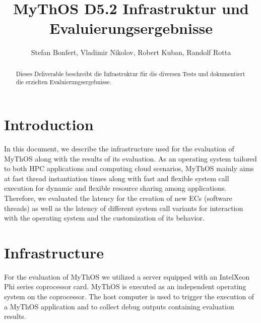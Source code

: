 

\title{MyThOS D5.2 Infrastruktur und Evaluierungsergebnisse}
\author{Stefan Bonfert, Vladimir Nikolov, Robert Kuban, Randolf Rotta}



\maketitle

\begin{abstract}

Dieses Deliverable beschreibt die Infrastruktur für die diversen Tests und
dokumentiert die erzielten Evaluierungsergebnisse.

\end{abstract}

\newpage
\tableofcontents


\section{Introduction}
\label{sec:introduction}
In this document, we describe the infrastructure used for the evaluation of
MyThOS along with the results of its evaluation. As an operating system tailored
to both HPC applications and computing cloud scenarios, MyThOS mainly aims at
fast thread instantiation times along with fast and flexible system call
execution for dynamic and flexible resource sharing among applications.
Therefore, we evaluated the latency for the creation of new ECs (software
threads) as well as the latency of different system call variants for
interaction with the operating system and the customization of its behavior.

\section{Infrastructure}
\label{sec:infrastructure}
For the evaluation of MyThOS we utilized a server equipped with an
Intel\textcopyright Xeon Phi series coprocessor card. MyThOS
is executed as an independent operating system on the coprocessor. The host
computer is used to trigger the execution of a MyThOS application and to collect
debug outputs containing evaluation results.

